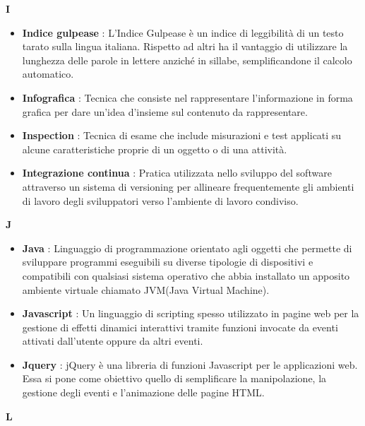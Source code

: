 \newpage
{\huge \textbf{I}}
\begin{flushleft}
\begin{itemize}[label={}]
\item \textbf{Indice gulpease} : L'Indice Gulpease è un indice di leggibilità di un testo tarato sulla lingua italiana. Rispetto ad altri ha il vantaggio di utilizzare la lunghezza delle parole in lettere anziché in sillabe, semplificandone il calcolo automatico.
\item \textbf{Infografica} : Tecnica che consiste nel rappresentare l'informazione in forma grafica per dare un'idea d'insieme sul contenuto da rappresentare.
\item \textbf{Inspection} :  Tecnica di esame che include misurazioni e test applicati su alcune caratteristiche proprie di un oggetto o di una attività.
\item \textbf{Integrazione continua} : Pratica utilizzata nello sviluppo del software attraverso un sistema di versioning per allineare frequentemente gli ambienti di lavoro degli sviluppatori verso l'ambiente di lavoro condiviso.
\end{itemize}
\end{flushleft}
\newpage
{\huge \textbf{J}}
\begin{flushleft}
\begin{itemize}[label={}]
\item \textbf{Java} : Linguaggio di programmazione orientato agli oggetti che permette di sviluppare programmi eseguibili su diverse tipologie di dispositivi e compatibili con qualsiasi sistema operativo che abbia installato un apposito ambiente virtuale chiamato JVM(Java Virtual Machine).
\item \textbf{Javascript} : Un linguaggio di scripting spesso utilizzato in pagine web per la gestione di effetti dinamici interattivi tramite funzioni invocate da eventi attivati dall'utente oppure da altri eventi.
\item \textbf{Jquery} : jQuery è una libreria di funzioni Javascript per le applicazioni web. Essa si pone come obiettivo quello di semplificare la manipolazione, la gestione degli eventi e l'animazione delle pagine HTML.
\end{itemize}
\end{flushleft}
\newpage
{\huge \textbf{L}}
